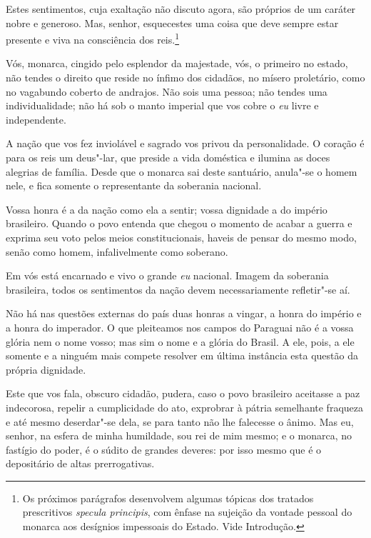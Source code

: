 \begin{linenumbers}

Estes sentimentos, cuja exaltação não discuto agora, são próprios de um
caráter nobre e generoso. Mas, senhor, esquecestes uma coisa que deve
sempre estar presente e viva na consciência dos reis.\footnote{ Os próximos parágrafos 
desenvolvem algumas tópicas dos tratados prescritivos \textit{specula principis}, com ênfase na 
sujeição da vontade pessoal do monarca aos desígnios impessoais do Estado. 
Vide Introdução.} 

Vós, monarca, cingido pelo esplendor da majestade, vós, o primeiro no
estado, não tendes o direito que reside no ínfimo dos cidadãos, no
mísero proletário, como no vagabundo coberto de andrajos. Não sois uma
pessoa; não tendes uma individualidade; não há sob o manto imperial que
vos cobre o \textit{eu} livre e independente. 

A nação que vos fez inviolável e sagrado vos privou da personalidade. O
coração é para os reis um deus"-lar, que preside a vida doméstica e
ilumina as doces alegrias de família. Desde que o monarca sai deste
santuário, anula"-se o homem nele, e fica somente o representante da
soberania nacional. 

Vossa honra é a da nação como ela a sentir; vossa dignidade a do império
brasileiro. Quando o povo entenda que chegou o momento de acabar a
guerra e exprima seu voto pelos meios constitucionais, haveis de pensar
do mesmo modo, senão como homem, infalivelmente como soberano.

Em vós está encarnado e vivo o grande \textit{eu} nacional. Imagem da
soberania brasileira, todos os sentimentos da nação devem
necessariamente refletir"-se aí. 

Não há nas questões externas do país duas honras a vingar, a honra do
império e a honra do imperador. O que pleiteamos nos campos do Paraguai
não é a vossa glória nem o nome vosso; mas sim o nome e a glória do
Brasil. A ele, pois, a ele somente e a ninguém mais compete resolver em
última instância esta questão da própria dignidade. 

Este que vos fala, obscuro cidadão, pudera, caso o povo brasileiro
aceitasse a paz indecorosa, repelir a cumplicidade do ato, exprobrar à
pátria semelhante fraqueza e até mesmo deserdar"-se dela, se para
tanto não lhe falecesse o ânimo. Mas eu, senhor, na esfera de minha
humildade, sou rei de mim mesmo; e o monarca, no fastígio do poder, é o
súdito de grandes deveres: por isso mesmo que é o depositário de altas prerrogativas.


\end{linenumbers}
